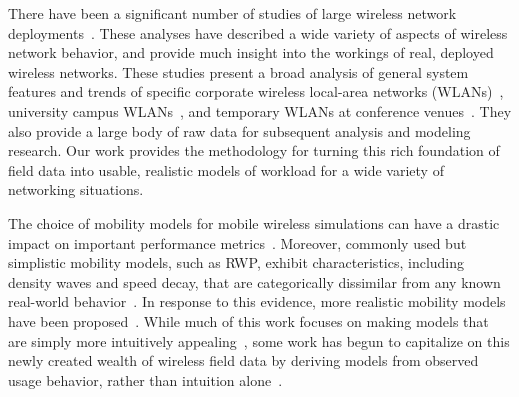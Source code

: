 \documentclass[conference]{IEEEtran}
\newcommand{\caps}[1]{{\small{#1}}}
\begin{document}
There have been a significant number of studies of large wireless network deployments~\cite{Tang99,Balachandran02,Balazinska03,Kotz02,Henderson04,Schwab04,Chinchilla04,Jardosh05:ewind}. These analyses have described a wide variety of aspects of wireless network behavior, and provide much insight into the workings of real, deployed wireless networks. These studies present a broad analysis of general system features and trends of specific corporate wireless local-area networks (\caps{WLAN}s)~\cite{Tang99,Balazinska03}, university campus \caps{WLAN}s~\cite{Tang00,Kotz02,Chinchilla04,Schwab04,Henderson04,Tuduce05}, and temporary \caps{WLAN}s at conference venues~\cite{Balachandran02,Jardosh05:ewind}. They also provide a large body of raw data for subsequent analysis and modeling research. Our work provides the methodology for turning this rich foundation of field data into usable, realistic models of workload for a wide variety of networking situations.

The choice of mobility models for mobile wireless simulations can have a drastic impact on important performance metrics~\cite{Camp02,Yoon03:speed-decay,Yoon03:sound-models,Jardosh03,Zheng04}. Moreover, commonly used but simplistic mobility models, such as \caps{RWP}, exhibit characteristics, including density waves and speed decay, that are categorically dissimilar from any known real-world behavior~\cite{Royer01,Yoon03:speed-decay,Yoon03:sound-models}. In response to this evidence, more realistic mobility models have been proposed~\cite{Jardosh03,Tuduce05,Jardosh05:voronoi}. While much of this work focuses on making models that are simply more intuitively appealing~\cite{Jardosh03,Jardosh05:voronoi}, some work has begun to capitalize on this newly created wealth of wireless field data by deriving models from observed usage behavior, rather than intuition alone~\cite{Balazinska03,Tuduce05}.
\end{document}
